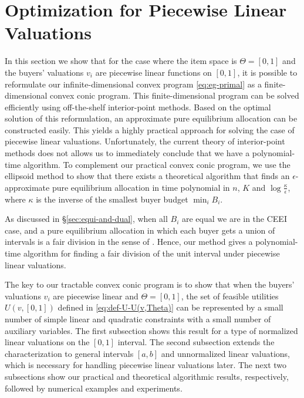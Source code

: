 \section{Optimization for Piecewise Linear Valuations} \label{sec:convex-opt-for-pwl}
In this section we show that for the case where the item space is $\Theta = [0,1]$ and the buyers' valuations $v_i$ are piecewise linear functions on $[0,1]$, it is possible to reformulate our infinite-dimensional convex program \eqref{eq:eg-primal} as a finite-dimensional convex conic program. 
This finite-dimensional program can be solved efficiently using off-the-shelf interior-point methods.
Based on the optimal solution of this reformulation, an approximate pure equilibrium allocation can be constructed easily.
This yields a highly practical approach for solving the case of piecewise linear valuations.
Unfortunately, the current theory of interior-point methods does not allows us to immediately conclude that we have a polynomial-time algorithm.
To complement our practical convex conic program, we use the ellipsoid method to 
show that there exists a theoretical algorithm that finds an $\epsilon$-approximate pure equilibrium allocation in time polynomial in $n$, $K$ and $\log \frac{\kappa}{\epsilon}$, where $\kappa$ is the inverse of the smallest buyer budget $\min_i B_i$.

As discussed in \S\ref{sec:equi-and-dual}, when all $B_i$ are equal we are in the CEEI case, and  a pure equilibrium allocation in which each buyer gets a union of intervals is a fair division in the sense of \citep{weller1985fair}. 
Hence, our method gives a polynomial-time algorithm for finding a fair division of the unit interval under piecewise linear valuations.

The key to our tractable convex conic program is to show that when the buyers' valuations $v_i$ are piecewise linear and $\Theta = [0,1]$, the set of feasible utilities $U(v, [0,1])$ defined in \eqref{eq:def-U-U(v,Theta)} can be represented by a small number of simple linear and quadratic constraints with a small number of auxiliary variables.
The first subsection shows this result for a type of normalized linear valuations on the $[0,1]$ interval. The second subsection extends the characterization to general intervals $[a,b]$ and unnormalized linear valuations, which is necessary for handling piecewise linear valuations later. 
The next two subsections show our practical and theoretical algorithmic results, respectively, followed by numerical examples and experiments.

